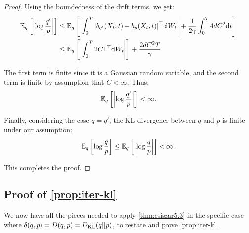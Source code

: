 \begin{proof}
Using the boundedness of the drift terms, we get:
\[
\begin{aligned}
    \E_{q}\left[\left|\log \frac{q'}{p}\right|\right] &\le \E_{q}\left[\left|\int_0^T \left|\drift_{q'}(\responseat{\timet}, t) - \drift_{p}(\responseat{\timet}, t)\right|^\top \de\brownianm\right| + \frac{1}{2\volatility} \int_0^T 4dC^2 \de t \right] \\
    &\le \E_{q}\left[\left|\int_0^T 2C \bm{1}^\top \de\brownianm\right|\right] + \frac{2dC^2 T}{\volatility}.
\end{aligned}
\]

The first term is finite since it is a Gaussian random variable, and the second term is finite by assumption that \(C < \infty\). Thus:
\[
\mathbb{E}_{q}\left[\left|\log \frac{q'}{p}\right|\right] < \infty.
\]

Finally, considering the case \(q = q'\), the KL divergence between \(q\) and \(p\) is finite under our assumption:
\[
\mathbb{E}_{q}\left[\log \frac{q}{p}\right] \le \mathbb{E}_{q}\left[\left|\log \frac{q}{p}\right|\right] < \infty.
\]

This completes the proof.
\end{proof}

\subsection{Proof of \texorpdfstring{\cref{prop:iter-kl}}{}}

We now have all the pieces needed to apply \cref{thm:csiszar5.3} in the specific case where $\delta(q,p)=D(q,p)=D_{\mathrm{KL}}(q||p)$, to restate and prove \cref{prop:iter-kl}.

\iterkl*

